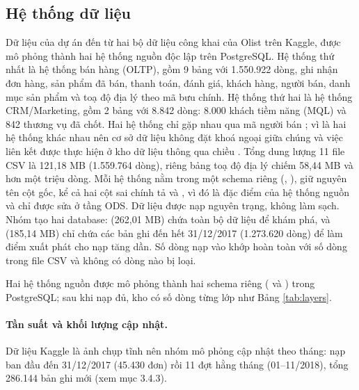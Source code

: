 \subsection{Hệ thống dữ liệu}
Dữ liệu của dự án đến từ hai bộ dữ liệu công khai của Olist trên Kaggle, được mô phỏng thành hai hệ thống nguồn độc lập trên PostgreSQL. Hệ thống thứ nhất là hệ thống bán hàng (OLTP), gồm 9 bảng với 1.550.922 dòng, ghi nhận đơn hàng, sản phẩm đã bán, thanh toán, đánh giá, khách hàng, người bán, danh mục sản phẩm và toạ độ địa lý theo mã bưu chính. Hệ thống thứ hai là hệ thống CRM/Marketing, gồm 2 bảng với 8.842 dòng: 8.000 khách tiềm năng (MQL) và 842 thương vụ đã chốt. Hai hệ thống chỉ gặp nhau qua mã người bán ; vì là hai hệ thống khác nhau nên cơ sở dữ liệu không đặt khoá ngoại giữa chúng và việc liên kết được thực hiện ở kho dữ liệu thông qua chiều . Tổng dung lượng 11 file CSV là 121,18 MB (1.559.764 dòng), riêng bảng toạ độ địa lý chiếm 58,44 MB và hơn một triệu dòng. Mỗi hệ thống nằm trong một schema riêng (, ), giữ nguyên tên cột gốc, kể cả hai cột sai chính tả  và , vì đó là đặc điểm của hệ thống nguồn và chỉ được sửa ở tầng ODS. Dữ liệu được nạp nguyên trạng, không làm sạch. Nhóm tạo hai database:  (262,01 MB) chứa toàn bộ dữ liệu để khám phá, và  (185,14 MB) chỉ chứa các bản ghi đến hết 31/12/2017 (1.273.620 dòng) để làm điểm xuất phát cho nạp tăng dần. Số dòng nạp vào  khớp hoàn toàn với số dòng trong file CSV và không có dòng nào bị loại.


Hai hệ thống nguồn được mô phỏng thành hai schema riêng ( và ) trong PostgreSQL; sau khi nạp đủ, kho có số dòng từng lớp như Bảng \ref{tab:layers}.

\paragraph{Tần suất và khối lượng cập nhật.} Dữ liệu Kaggle là ảnh chụp tĩnh nên nhóm mô phỏng cập nhật theo tháng: nạp ban đầu đến 31/12/2017 (45.430 đơn) rồi 11 đợt hằng tháng (01--11/2018), tổng 286.144 bản ghi mới (xem mục 3.4.3).

